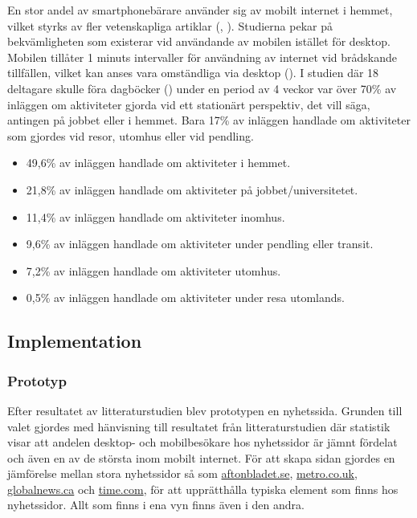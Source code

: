 \documentclass[11pt]{article}
\begin{document}
En stor andel av smartphonebärare använder sig av mobilt internet i hemmet, vilket styrks av fler vetenskapliga artiklar (\cite{mobilewebsearch}, \cite{mobilefirstluke}). Studierna pekar på bekvämligheten som existerar vid användande av mobilen istället för desktop. Mobilen tillåter 1 minuts intervaller för användning av internet vid brådskande tillfällen, vilket kan anses vara omständliga via desktop (\cite{mobilewebsearch}). I studien där 18 deltagare skulle föra dagböcker (\cite{mobilewebsearch}) under en period av 4 veckor var över 70\% av inläggen om aktiviteter gjorda vid ett stationärt perspektiv, det vill säga, antingen på jobbet eller i hemmet. Bara 17\% av inläggen handlade om aktiviteter som gjordes vid resor, utomhus eller vid pendling.
\\
\begin{itemize}
	\item{49,6\% av inläggen handlade om aktiviteter i hemmet.}
	\item{21,8\% av inläggen handlade om aktiviteter på jobbet/universitetet.}
	\item{11,4\% av inläggen handlade om aktiviteter inomhus.}
	\item{9,6\% av inläggen handlade om aktiviteter under pendling eller transit.}
	\item{7,2\% av inläggen handlade om aktiviteter utomhus.}
	\item{0,5\% av inläggen handlade om aktiviteter under resa utomlands.}
\end{itemize}
\bigskip

\subsection{Implementation}
\subsubsection{Prototyp}
Efter resultatet av litteraturstudien blev prototypen en nyhetssida. Grunden till valet gjordes med hänvisning till resultatet från litteraturstudien där statistik visar att andelen desktop- och mobilbesökare hos nyhetssidor är jämnt fördelat och även en av de största inom mobilt internet. För att skapa sidan gjordes en jämförelse mellan stora nyhetssidor så som \href{http://www.aftonbladet.se}{aftonbladet.se}, \href{http://www.metro.co.uk}{metro.co.uk}, \href{http://www.globalnews.ca}{globalnews.ca} och \href{http://www.time.com}{time.com}, för att upprätthålla typiska element som finns hos nyhetssidor. Allt som finns i ena vyn finns även i den andra.
\end{document}
